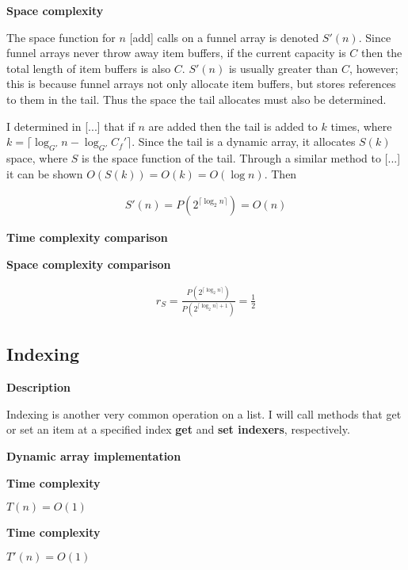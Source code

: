 \documentclass{article}
\newcommand{\descriptn}{\textbf{Description}}
\newcommand{\dynarrayimpl}{\textbf{Dynamic array implementation}}
\newcommand{\tcomplex}{\textbf{Time complexity}}
\newcommand{\scomplex}{\textbf{Space complexity}}
\newcommand{\tcomplexcmp}{\textbf{Time complexity comparison}}
\newcommand{\scomplexcmp}{\textbf{Space complexity comparison}}
\newcommand{\timefn}{T}
\newcommand{\spacefn}{S}
\newcommand{\timenewfn}{\timefn'}
\newcommand{\spacenewfn}{\spacefn'}
\newcommand{\spaceratio}{r_\spacefn}
\newcommand{\bigo}{O}
\newcommand{\biggo}{P}
\newcommand{\varnitems}{n}
\newcommand{\initcapacity}{C_f}
\newcommand{\growthfactor}{G}
\newcommand{\initcapacitynew}{\initcapacity'}
\newcommand{\growthfactornew}{\growthfactor'}
\begin{document}
	\scomplex
	
	The space function for $\varnitems$ [add] calls on a funnel array is denoted $\spacenewfn(\varnitems)$. Since funnel arrays never throw away item buffers, if the current capacity is $C$ then the total length of item buffers is also $C$. $\spacenewfn(\varnitems)$ is usually greater than $C$, however; this is because funnel arrays not only allocate item buffers, but stores references to them in the tail. Thus the space the tail allocates must also be determined.
	
	I determined in [...] that if $\varnitems$ are added then the tail is added to $k$ times, where $k = \lceil \log_{\growthfactornew} \varnitems - \log_{\growthfactornew} \initcapacitynew \rceil$. Since the tail is a dynamic array, it allocates $\spacefn(k)$ space, where $\spacefn$ is the space function of the tail. Through a similar method to [...] it can be shown $\bigo(\spacefn(k)) = \bigo(k) = \bigo(\log \varnitems)$. Then %
	
	\begin{align*}
	\spacenewfn(\varnitems) = \biggo(2^{\lceil \log_2 \varnitems \rceil}) = \bigo(\varnitems)
	\end{align*}
	
	\tcomplexcmp
	
	\scomplexcmp
	
	\begin{align*}
	\spaceratio = \frac {\biggo(2^{\lceil \log_2 \varnitems \rceil})} {\biggo(2^{\lceil \log_2 \varnitems \rceil + 1})} = \frac{1}{2}
	\end{align*}
	
	\subsection{Indexing}
	
	\descriptn
	
	Indexing is another very common operation on a list. I will call methods that get or set an item at a specified index \textbf{get} and \textbf{set indexers}, respectively.
	
	\dynarrayimpl
	
	\tcomplex
	
	$\timefn(\varnitems) = \bigo(1)$
	
	
	\tcomplex
	
	$\timenewfn(\varnitems) = \bigo(1)$
	
\end{document}
